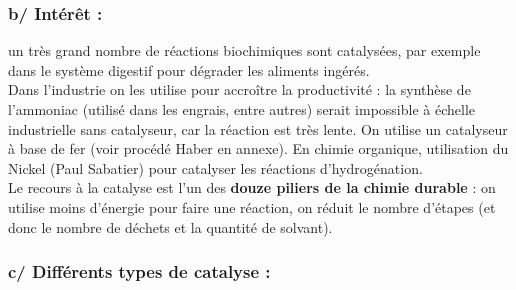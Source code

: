 \documentclass[11pt,a4paper]{report}
\begin{document}
\subsubsection*{b/ Intérêt :} un très grand nombre de réactions biochimiques sont catalysées, 		par exemple dans le système digestif pour dégrader les aliments ingérés.\\
 	
	Dans l'industrie on les utilise pour accroître la productivité : la synthèse de l'ammoniac 		(utilisé dans les engrais, entre autres) serait impossible à échelle industrielle sans catalyseur, car la réaction est très lente. On utilise un catalyseur à base de fer (voir procédé Haber en annexe). En chimie organique, utilisation du Nickel (Paul Sabatier) pour catalyser les réactions d'hydrogénation.\\
	
	Le recours à la catalyse est l'un des \textbf{douze piliers de la chimie durable} : on utilise moins d'énergie pour faire une réaction, on réduit le nombre d'étapes (et donc le nombre de déchets et la quantité de solvant).

\subsubsection*{c/ Différents types de catalyse :} 
\end{document}
